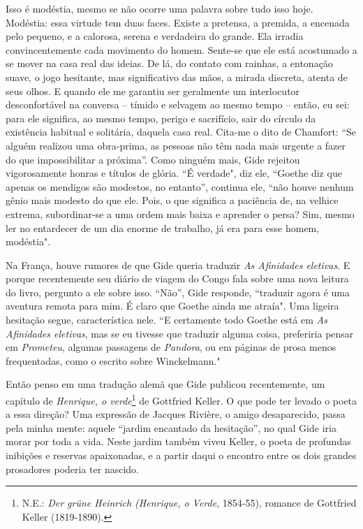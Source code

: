 Isso é modéstia, mesmo se não ocorre uma palavra sobre tudo isso hoje.
Modéstia: essa virtude tem duas faces. Existe a pretensa, a premida, a
encenada pelo pequeno, e a calorosa, serena e verdadeira do grande. Ela
irradia convincentemente cada movimento do homem. Sente-se que ele está
acostumado a se mover na casa real das ideias. De lá, do contato com
rainhas, a entonação suave, o jogo hesitante, mas significativo das
mãos, a mirada discreta, atenta de seus olhos. E quando ele me garantiu
ser geralmente um interlocutor desconfortável na conversa -- tímido e
selvagem ao mesmo tempo -- então, eu sei: para ele significa, ao mesmo
tempo, perigo e sacrifício, sair do círculo da existência habitual e
solitária, daquela casa real. Cita-me o dito de Chamfort: ``Se alguém
realizou uma obra-prima, as pessoas não têm nada mais urgente a fazer do
que impossibilitar a próxima''. Como ninguém mais, Gide rejeitou
vigorosamente honras e títulos de glória. ``É verdade", diz ele,
``Goethe diz que apenas os mendigos são modestos, no entanto'', continua
ele, ``não houve nenhum gênio mais modesto do que ele. Pois, o que
significa a paciência de, na velhice extrema, subordinar-se a uma ordem
mais baixa e aprender o persa? Sim, mesmo ler no entardecer de um dia
enorme de trabalho, já era para esse homem, modéstia".

Na França, houve rumores de que Gide queria traduzir \emph{As Afinidades
eletivas}. E porque recentemente seu diário de viagem do Congo fala
sobre uma nova leitura do livro, pergunto a ele sobre isso. ``Não'',
Gide responde, ``traduzir agora é uma aventura remota para mim. É claro
que Goethe ainda me atraía". Uma ligeira hesitação segue, característica
nele. ``E certamente todo Goethe está em \emph{As} \emph{Afinidades
eletivas}, mas se eu tivesse que traduzir alguma coisa, preferiria
pensar em \emph{Prometeu}, algumas passagens de \emph{Pandora}, ou em
páginas de prosa menos frequentadas, como o escrito sobre Winckelmann."

Então penso em uma tradução alemã que Gide publicou recentemente, um
capítulo de \emph{Henrique, o verde}\footnote{N.E.: \emph{Der grüne
  Heinrich (Henrique, o Verde}, 1854-55), romance de Gottfried Keller
  (1819-1890).} de Gottfried Keller. O que pode ter levado o poeta a
essa direção? Uma expressão de Jacques Rivière, o amigo desaparecido,
passa pela minha mente: aquele ``jardim encantado da hesitação'', no
qual Gide iria morar por toda a vida. Neste jardim também viveu Keller,
o poeta de profundas inibições e reservas apaixonadas, e a partir daqui
o encontro entre os dois grandes prosadores poderia ter nascido.


